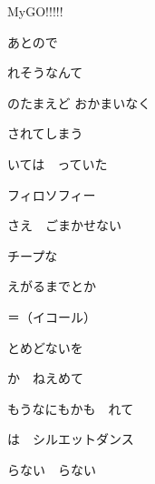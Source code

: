 \documentclass[a4paper,tate,twocolumn,12pt]{ltjtarticle}
\begin{document}
\thispagestyle{empty}

\begin{center}
{\LARGE {}}

{\large MyGO!!!!!}
\end{center}

\vspace{1em}

\begin{flushleft}

\noindent\begin{minipage}{\linewidth}
あとので

れそうなんて

のたまえど おかまいなく


されてしまう
\end{minipage}

\vspace{2em}

\noindent\begin{minipage}{\linewidth}
いては　っていた

フィロソフィー

さえ　ごまかせない

チープな
\end{minipage}

\vspace{2em}

\noindent\begin{minipage}{\linewidth}
えがるまでとか

＝（イコール）

とめどないを

か　ねえめて
\end{minipage}

\vspace{2em}

\noindent\begin{minipage}{\linewidth}
もうなにもかも　れて

は　シルエットダンス

らない　らない



\end{minipage}
\end{flushleft}
\end{document}
